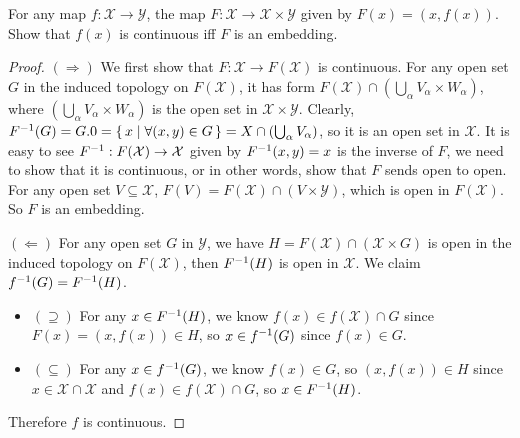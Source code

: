 \documentclass[./main.tex]{subfiles}
\begin{document}
\begin{theorem}
  For any map $f : \mathcal{X} \rightarrow \mathcal{Y}$, the map
  $F : \mathcal{X} \rightarrow \mathcal{X} \times \mathcal{Y}$ given by
  $F(x) = (x, f(x))$. Show that $f(x)$ is continuous iff $F$
  is an embedding.
\end{theorem}
\begin{proof}
  $(\Rightarrow)$ We first show that $F : \mathcal{X} \rightarrow F(\mathcal{X})$ is continuous.
  For any open set $G$ in the induced topology on $F(\mathcal{X})$,
  it has form $F(\mathcal{X}) \cap (\bigcup_\alpha V_\alpha \times W_\alpha)$,
  where $(\bigcup_\alpha V_\alpha \times W_\alpha)$ is the open set in $\mathcal{X} \times \mathcal{Y}$.
  Clearly, $F^{-1}(G) = G.0 = \set{ x \mid \forall (x, y) \in G} = X \cap (\bigcup_\alpha V_\alpha)$,
  so it is an open set in $\mathcal{X}$.
  It is easy to see $F^{-1} : F(\mathcal{X}) \rightarrow \mathcal{X}$ given by $F^{-1}(x, y) = x$ is
  the inverse of $F$, we need to show that it is continuous, or in other words,
  show that $F$ sends open to open.
  For any open set $V \subseteq \mathcal{X}$, $F(V) = F(\mathcal{X}) \cap (V \times \mathcal{Y})$,
  which is open in $F(\mathcal{X})$.
  So $F$ is an embedding. \par
  $(\Leftarrow)$ For any open set $G$ in $\mathcal{Y}$, we have $H = F(\mathcal{X}) \cap (\mathcal{X} \times G)$
  is open in the induced topology on $F(\mathcal{X})$, then $F^{-1}(H)$ is open in $\mathcal{X}$.
  We claim $f^{-1}(G) = F^{-1}(H)$. 
  \begin{itemize}
    \item $(\supseteq)$ For any $x \in F^{-1}(H)$,
    we know $f(x) \in f(\mathcal{X}) \cap G$ since $F(x) = (x, f(x)) \in H$, so $x \in f^{-1}(G)$
    since $f(x) \in G$. 
    \item $(\subseteq)$ For any $x \in f^{-1}(G)$, we know $f(x) \in G$,
    so $(x, f(x)) \in H$ since $x \in \mathcal{X} \cap \mathcal{X}$ and $f(x) \in f(\mathcal{X}) \cap G$,
    so $x \in F^{-1}(H)$. 
  \end{itemize}
  Therefore $f$ is continuous.
\end{proof}
\end{document}
